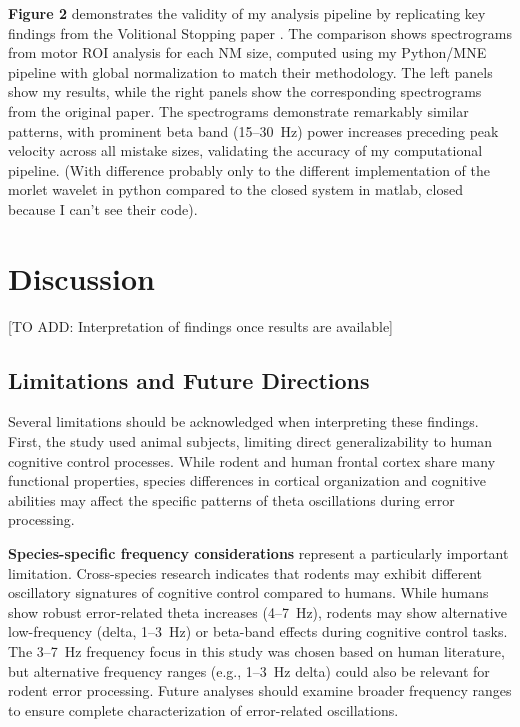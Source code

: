\documentclass[11pt]{article}
\begin{document}
\textbf{Figure 2} demonstrates the validity of my analysis pipeline by replicating key findings from the Volitional Stopping paper \citep{doutel2024volitional}. The comparison shows spectrograms from motor ROI analysis for each NM size, computed using my Python/MNE pipeline with global normalization to match their methodology. The left panels show my results, while the right panels show the corresponding spectrograms from the original paper. The spectrograms demonstrate remarkably similar patterns, with prominent beta band (15--30~Hz) power increases preceding peak velocity across all mistake sizes, validating the accuracy of my computational pipeline. (With difference probably only to the different implementation of the morlet wavelet in python compared to the closed system in matlab, closed because I can't see their code).

\section{Discussion}

[TO ADD: Interpretation of findings once results are available]

\subsection{Limitations and Future Directions}

Several limitations should be acknowledged when interpreting these findings. First, the study used animal subjects, limiting direct generalizability to human cognitive control processes. While rodent and human frontal cortex share many functional properties, species differences in cortical organization and cognitive abilities may affect the specific patterns of theta oscillations during error processing.

\textbf{Species-specific frequency considerations} represent a particularly important limitation. Cross-species research indicates that rodents may exhibit different oscillatory signatures of cognitive control compared to humans. While humans show robust error-related theta increases (4--7~Hz), rodents may show alternative low-frequency (delta, 1--3~Hz) or beta-band effects during cognitive control tasks. The 3--7~Hz frequency focus in this study was chosen based on human literature, but alternative frequency ranges (e.g., 1--3~Hz delta) could also be relevant for rodent error processing. Future analyses should examine broader frequency ranges to ensure complete characterization of error-related oscillations.
\end{document}
